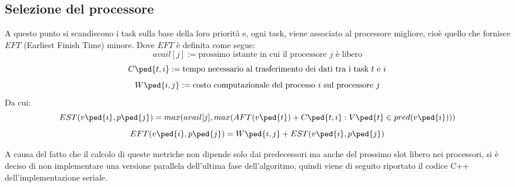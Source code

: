 \subsection{Selezione del processore}
A questo punto si scandiscono i task sulla base della loro priorità e, ogni task, viene associato al processore migliore, cioè quello che fornisce $EFT$ (Earliest Finish Time) minore. 
Dove $EFT$ è definita come segue:
\begin{displaymath}
	avail[j] := \text{prossimo istante in cui il processore $j$ è libero}
\end{displaymath}
\begin{displaymath}
	C\ped{t,i} := \text{tempo necessario al trasferimento dei dati tra i task $t$ e $i$} 
\end{displaymath}
\begin{displaymath}
	W\ped{i,j} := \text{costo computazionale del processo $i$ sul processore $j$} 
\end{displaymath}
Da cui:
\begin{equation}\label{EST}
	EST(v\ped{i},p\ped{j}) = max(avail[j], max(AFT(v\ped{t}) + C\ped{t,i} : V\ped{t} \in pred(v\ped{i})))
\end{equation}
\begin{equation}\label{EFT}
	EFT(v\ped{i},p\ped{j}) = W\ped{i,j} + EST(v\ped{i},p\ped{j})
\end{equation}

A causa del fatto che il calcolo di queste metriche non dipende solo dai predecessori ma anche del prossimo slot libero nei processori, si è deciso di non implementare una versione parallela dell'ultima fase dell'algoritmo, quindi viene di seguito riportato il codice C++ dell'implementazione seriale.


